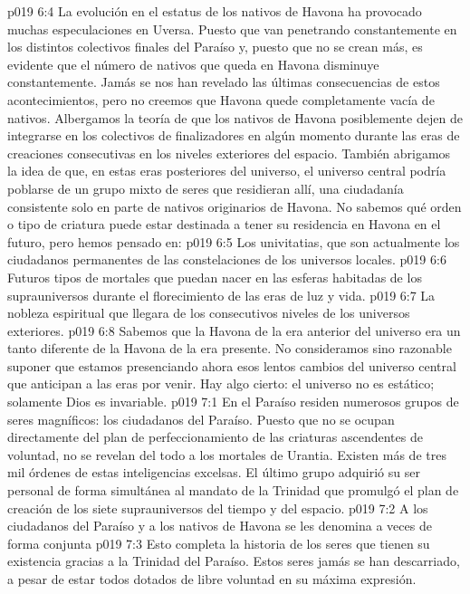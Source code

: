 \vs p019 6:4 \pc La evolución en el estatus de los nativos de Havona ha provocado muchas especulaciones en Uversa. Puesto que van penetrando constantemente en los distintos colectivos finales del Paraíso y, puesto que no se crean más, es evidente que el número de nativos que queda en Havona disminuye constantemente. Jamás se nos han revelado las últimas consecuencias de estos acontecimientos, pero no creemos que Havona quede completamente vacía de nativos. Albergamos la teoría de que los nativos de Havona posiblemente dejen de integrarse en los colectivos de finalizadores en algún momento durante las eras de creaciones consecutivas en los niveles exteriores del espacio. También abrigamos la idea de que, en estas eras posteriores del universo, el universo central podría poblarse de un grupo mixto de seres que residieran allí, una ciudadanía consistente solo en parte de nativos originarios de Havona. No sabemos qué orden o tipo de criatura puede estar destinada a tener su residencia en Havona en el futuro, pero hemos pensado en:
\vs p019 6:5 Los univitatias, que son actualmente los ciudadanos permanentes de las constelaciones de los universos locales.
\vs p019 6:6 Futuros tipos de mortales que puedan nacer en las esferas habitadas de los suprauniversos durante el florecimiento de las eras de luz y vida.
\vs p019 6:7 La nobleza espiritual que llegara de los consecutivos niveles de los universos exteriores.
\vs p019 6:8 Sabemos que la Havona de la era anterior del universo era un tanto diferente de la Havona de la era presente. No consideramos sino razonable suponer que estamos presenciando ahora esos lentos cambios del universo central que anticipan a las eras por venir. Hay algo cierto: el universo no es estático; solamente Dios es invariable.
\vs p019 7:1 En el Paraíso residen numerosos grupos de seres magníficos: los ciudadanos del Paraíso. Puesto que no se ocupan directamente del plan de perfeccionamiento de las criaturas ascendentes de voluntad, no se revelan del todo a los mortales de Urantia. Existen más de tres mil órdenes de estas inteligencias excelsas. El último grupo adquirió su ser personal de forma simultánea al mandato de la Trinidad que promulgó el plan de creación de los siete suprauniversos del tiempo y del espacio.
\vs p019 7:2 \pc A los ciudadanos del Paraíso y a los nativos de Havona se les denomina a veces de forma conjunta 
\vs p019 7:3 \pc Esto completa la historia de los seres que tienen su existencia gracias a la Trinidad del Paraíso. Estos seres jamás se han descarriado, a pesar de estar todos dotados de libre voluntad en su máxima expresión.

